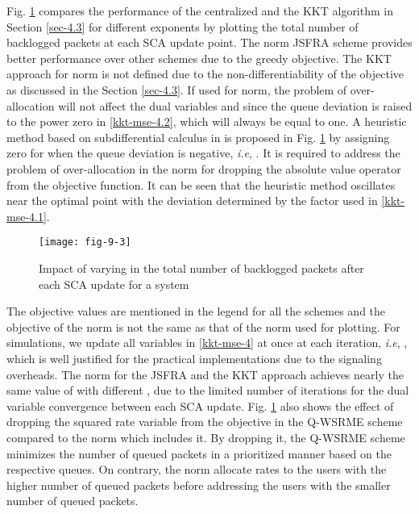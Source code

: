 Fig. \ref{fig-d-3.1} compares the performance of the centralized and the \ac{KKT} algorithm in Section \ref{sec-4.3} for different exponents by plotting the total number of backlogged packets at each \ac{SCA} update point. The  norm \ac{JSFRA} scheme provides better performance over other schemes due to the greedy objective. The \ac{KKT} approach for  norm is not defined due to the non-differentiability of the objective as discussed in the Section \ref{sec-4.3}. If used for  norm, the problem of over-allocation will not affect the dual variables  and  since the queue deviation is raised to the power zero in \eqref{kkt-mse-4.2}, which will always be equal to one. A heuristic method based on subdifferential calculus in \cite{bertsekas1999nonlinear} is proposed in Fig. \ref{fig-d-3.1} by assigning zero for  when the queue deviation is negative, \textit{i.e}, . It is required to address the problem of over-allocation in the  norm for dropping the absolute value operator from the objective function. It can be seen that the heuristic method oscillates near the optimal point with the deviation determined by the factor \me{\rho} used in \eqref{kkt-mse-4.1}.
\begin{figure}
	\centering
	\texttt{[image: fig-9-3]}
	\caption{Impact of varying  in the total number of backlogged packets after each \ac{SCA} update for a system }
	\label{fig-d-3.1} \vspace{-0.1in}
\end{figure}

The objective values are mentioned in the legend for all the schemes and the objective of the  norm is not the same as that of the  norm used for plotting. For simulations, we update all variables in \eqref{kkt-mse-4} at once at each iteration, \textit{i.e}, , which is well justified for the practical implementations due to the signaling overheads. The  norm for the \ac{JSFRA} and the \ac{KKT} approach achieves nearly the same value of  with different \me{\chi}, due to the limited number of iterations for the dual variable convergence between each \ac{SCA} update. Fig. \ref{fig-d-3.1} also shows the effect of dropping the squared rate variable from the objective in the \ac{Q-WSRME} scheme compared to the  norm which includes it. By dropping it, the \ac{Q-WSRME} scheme minimizes the number of queued packets in a prioritized manner based on the respective queues. On contrary, the  norm allocate rates to the users with the higher number of queued packets before addressing the users with the smaller number of queued packets.


